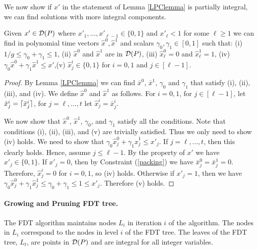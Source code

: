 We now show if $x'$ in the statement of Lemma \ref{LPClemma} is partially integral, we can find solutions with more integral components.
\begin{lemma}\label{round-up}
	Given $x'\in \operatorname{\mathcal{D}}(P)$ where $x'_1,\ldots,x'_{\ell-1}\in \{0,1\}$ and $x'_{\ell}<1$ for some $\ell\geq 1$ we can find in polynomial time vectors $\hat{x}^0,\hat{x}^1$ and scalars $\gamma_0,\gamma_1 \in [0,1]$ such that: (i) ${ 1}/{g}\leq \gamma_0 + \gamma_1  \leq 1$, (ii) $\hat{x}^0$ and $\hat{x}^1$ are in  $\operatorname{\mathcal{D}}( P)$, (iii) $\hat{x}^0_\ell=0$ and $\hat{x}^1_\ell=1$, (iv) $ \gamma_0\hat{x}^0 +\gamma_1 \hat{x}^1 \leq
	x'$,(v) $\hat{x}^i_j\in \{0,1\}$ for $i=0,1$ and $j\in[\ell-1]$.
\end{lemma} 
\begin{proof}
	By Lemma \ref{LPClemma} we can find $\bar{x}^0$, $\bar{x}^1$, $\gamma_0$ and $\gamma_1$ that satisfy (i), (ii), (iii), and (iv). We define $\hat{x}^0$ and $\hat{x}^1$ as follows. For $i=0,1$, for $j\in[\ell-1]$, let $\hat{x}^i_j= \lceil\bar{x}^i_j\rceil$, for $j=\ell,\ldots,t$ let $\hat{x}^i_j = \bar{x}^i_j$.
	
	
	We now show that $\hat{x}^0$, $\hat{x}^1$, $\gamma_0$, and $\gamma_1$ satisfy all the conditions. Note that conditions (i), (ii), (iii), and (v) are trivially satisfied. Thus we only need to show (iv) holds. We need to show that $\gamma_0 \hat{x}^0_j+\gamma_1\hat{x}^1_j\leq x'_j$. If $j=\ell,\ldots,t$, then this clearly holds. Hence, assume $j\leq \ell-1$. By the property of $x'$ we have $x'_j\in \{0,1\}$. If $x'_j= 0$, then by Constraint (\ref{packing}) we have $\bar{x}^0_j = \bar{x}^1_j=0$. Therefore, $\hat{x}^i_j=0$ for $i=0,1$, so (iv) holds. Otherwise if $x'_j = 1$, then we have
	$\gamma_0\hat{x}^0_j+\gamma_1\hat{x}^1_j\leq \gamma_0+\gamma_1\leq 1\leq x'_j.$ 
	Therefore (v) holds.
\end{proof}

\paragraph{Growing and Pruning FDT tree.} The FDT algorithm maintains nodes $L_i$ in iteration $i$ of the algorithm. The nodes in $L_i$ correspond to the nodes in level $i$ of the FDT tree. The leaves of the FDT tree, $L_t$, are points in $\operatorname{\mathcal{D}}(P)$ and are integral for all integer variables.


